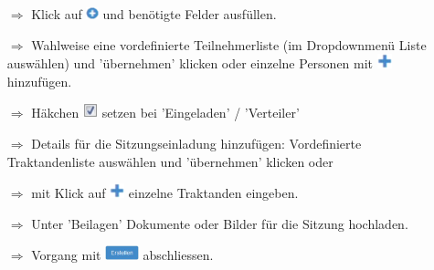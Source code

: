 \documentclass{article}
\begin{document}
\begin{multicols}{2}

\begin{tcolorbox}[colback=blue!5,colframe=blue!40!black,title=Zu einer neuen Sitzung einladen]
\begin{itemize}
  \item[$\Longrightarrow$] Klick auf \includegraphics[height=10pt]{Icons/Plussymbol.png} und benötigte Felder ausfüllen.
  \item[$\Longrightarrow$] Wahlweise eine vordefinierte Teilnehmerliste (im Dropdownmenü Liste auswählen) und 'übernehmen' klicken oder einzelne Personen mit \includegraphics[height=12pt]{Icons/Pluszeichen.png} hinzufügen.
  \item[$\Longrightarrow$] Häkchen \includegraphics[height=12pt]{Icons/sbox_ok.png} setzen bei 'Eingeladen' / 'Verteiler'
	\item[$\Longrightarrow$] Details für die Sitzungseinladung hinzufügen: Vordefinierte Traktandenliste auswählen und 'übernehmen' klicken oder
  \item[$\Longrightarrow$] mit Klick auf \includegraphics[height=12pt]{Icons/Pluszeichen.png}  einzelne Traktanden eingeben.
  \item[$\Longrightarrow$] Unter 'Beilagen' Dokumente oder Bilder für die Sitzung hochladen.						
	\item[$\Longrightarrow$] Vorgang mit \includegraphics[height=12pt]{Icons/B_Erstellen.jpg} abschliessen.
\end{itemize}
\end{tcolorbox}





\end{multicols}
\end{document}
